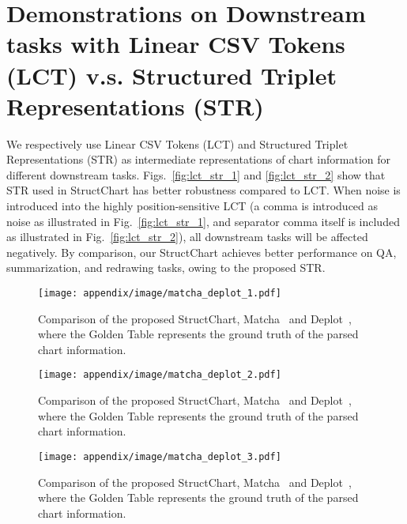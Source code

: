 \documentclass{article} \usepackage{iclr2024_conference,times}
\begin{document}
{\section{Demonstrations on Downstream tasks with Linear CSV Tokens (LCT) v.s. Structured Triplet Representations (STR) }
\label{app:compare_lct_str}
We respectively use Linear CSV Tokens (LCT) and Structured Triplet Representations (STR) as intermediate representations of chart information for different downstream tasks. Figs.~\ref{fig:lct_str_1} and \ref{fig:lct_str_2} show that STR used in StructChart has better robustness compared to LCT. When noise is introduced into the highly position-sensitive LCT (a comma is introduced as noise as illustrated in Fig.~\ref{fig:lct_str_1}, and separator comma itself is included as illustrated in Fig.~\ref{fig:lct_str_2}), all downstream tasks will be affected negatively. By comparison, our StructChart achieves better performance on QA, summarization, and redrawing tasks, owing to the proposed STR.

\begin{figure}[tb!]
\centering
\texttt{[image: appendix/image/matcha\_deplot\_1.pdf]}
\vspace{-5pt}
\caption{Comparison of the proposed StructChart, Matcha~\citep{Liu2022MatChaEV} and Deplot~\citep{Liu2022DePlotOV}, where the Golden Table represents the ground truth of the parsed chart information.}
\label{fig:vis_compare_1}
\end{figure}

\begin{figure}[tb!]
\centering
\texttt{[image: appendix/image/matcha\_deplot\_2.pdf]}
\vspace{-5pt}
\caption{Comparison of the proposed StructChart, Matcha~\citep{Liu2022MatChaEV} and Deplot~\citep{Liu2022DePlotOV}, where the Golden Table represents the ground truth of the parsed chart information.}
\label{fig:vis_compare_2}
\end{figure}

\begin{figure}[tb!]
\centering
\texttt{[image: appendix/image/matcha\_deplot\_3.pdf]}
\vspace{-5pt}
\caption{Comparison of the proposed StructChart, Matcha~\citep{Liu2022MatChaEV} and Deplot~\citep{Liu2022DePlotOV}, where the Golden Table represents the ground truth of the parsed chart information.}
\label{fig:vis_compare_3}
\end{figure}

}
\end{document}
